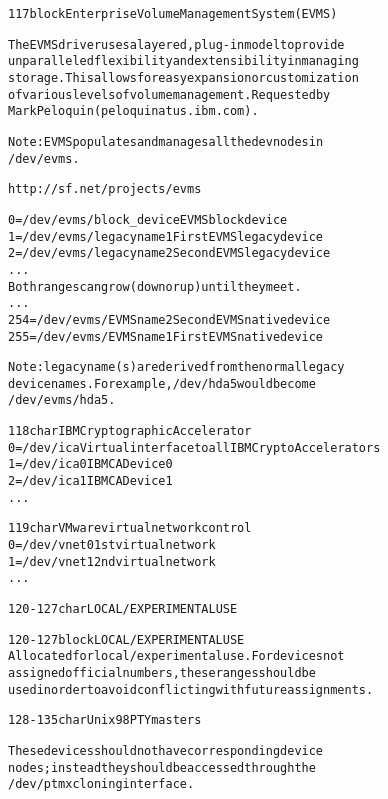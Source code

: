 \documentclass[a4paper,8pt,english]{sphinxmanual}
\begin{document}
\begin{alltt}
 117 block       Enterprise Volume Management System (EVMS)

                The EVMS driver uses a layered, plug-in model to provide
                unparalleled flexibility and extensibility in managing
                storage.  This allows for easy expansion or customization
                of various levels of volume management.  Requested by
                Mark Peloquin (peloquin at us.ibm.com).

                Note: EVMS populates and manages all the devnodes in
                /dev/evms.

                http://sf.net/projects/evms

                   0 = /dev/evms/block\_device   EVMS block device
                   1 = /dev/evms/legacyname1    First EVMS legacy device
                   2 = /dev/evms/legacyname2    Second EVMS legacy device
                    ...
                    Both ranges can grow (down or up) until they meet.
                    ...
                 254 = /dev/evms/EVMSname2      Second EVMS native device
                 255 = /dev/evms/EVMSname1      First EVMS native device

                Note: legacyname(s) are derived from the normal legacy
                device names.  For example, /dev/hda5 would become
                /dev/evms/hda5.

 118 char       IBM Cryptographic Accelerator
                  0 = /dev/ica  Virtual interface to all IBM Crypto Accelerators
                  1 = /dev/ica0 IBMCA Device 0
                  2 = /dev/ica1 IBMCA Device 1
                    ...

 119 char       VMware virtual network control
                  0 = /dev/vnet0        1st virtual network
                  1 = /dev/vnet1        2nd virtual network
                    ...

 120-127 char   LOCAL/EXPERIMENTAL USE

 120-127 block  LOCAL/EXPERIMENTAL USE
                Allocated for local/experimental use.  For devices not
                assigned official numbers, these ranges should be
                used in order to avoid conflicting with future assignments.

 128-135 char   Unix98 PTY masters

                These devices should not have corresponding device
                nodes; instead they should be accessed through the
                /dev/ptmx cloning interface.


\end{alltt}
\end{document}
